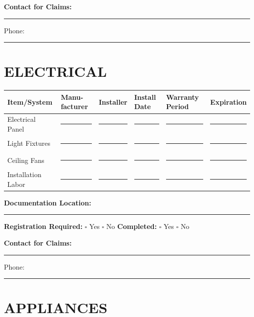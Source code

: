\documentclass[11pt,letterpaper]{article}
\begin{document}
\textbf{Contact for Claims:} \rule{7cm}{0.4pt} Phone: \rule{3cm}{0.4pt}

\vspace{12pt}

\section*{ELECTRICAL}

\begin{tabular}{|p{1.5in}|p{1in}|p{1in}|p{0.8in}|p{0.8in}|p{1in}|}
\hline
\textbf{Item/System} & \textbf{Manu-facturer} & \textbf{Installer} & \textbf{Install Date} & \textbf{Warranty Period} & \textbf{Expiration} \\
\hline
Electrical Panel & \rule{0.8in}{0.4pt} & \rule{0.8in}{0.4pt} & \rule{0.6in}{0.4pt} & \rule{0.6in}{0.4pt} & \rule{0.8in}{0.4pt} \\
\hline
Light Fixtures & \rule{0.8in}{0.4pt} & \rule{0.8in}{0.4pt} & \rule{0.6in}{0.4pt} & \rule{0.6in}{0.4pt} & \rule{0.8in}{0.4pt} \\
\hline
Ceiling Fans & \rule{0.8in}{0.4pt} & \rule{0.8in}{0.4pt} & \rule{0.6in}{0.4pt} & \rule{0.6in}{0.4pt} & \rule{0.8in}{0.4pt} \\
\hline
Installation Labor & \rule{0.8in}{0.4pt} & \rule{0.8in}{0.4pt} & \rule{0.6in}{0.4pt} & \rule{0.6in}{0.4pt} & \rule{0.8in}{0.4pt} \\
\hline
\end{tabular}

\vspace{6pt}

\textbf{Documentation Location:} \rule{8cm}{0.4pt}

\textbf{Registration Required:} $\square$ Yes $\square$ No \hspace{0.3in} \textbf{Completed:} $\square$ Yes $\square$ No

\textbf{Contact for Claims:} \rule{7cm}{0.4pt} Phone: \rule{3cm}{0.4pt}

\newpage

\section*{APPLIANCES}
\end{document}
